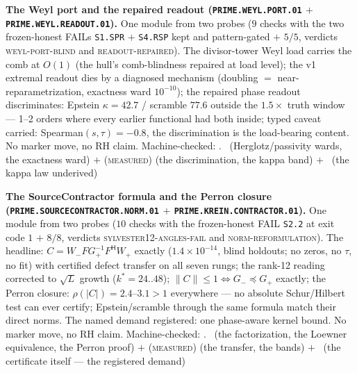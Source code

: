 \par\smallskip\noindent\textbf{The Weyl port and the repaired
readout (\texttt{PRIME.WEYL.\allowbreak PORT.01} $+$
\texttt{PRIME.WEYL.\allowbreak READOUT.01}).}
One module from two probes ($9$ checks with the two
frozen-honest FAILs \texttt{S1.SPR} $+$ \texttt{S4.RSP} kept
and pattern-gated $+$ $5/5$, verdicts \textsc{weyl-port-blind}
and \textsc{readout-repaired}).  The divisor-tower Weyl load
carries the comb at $O(1)$ (the hull's comb-blindness repaired
at load level); the v1 extremal readout dies by a diagnosed
mechanism (doubling $=$ near-reparametrization, exactness ward
$10^{-10}$); the repaired phase readout discriminates: Epstein
$\kappa = 42.7$ / scramble $77.6$ outside the $1.5\times$ truth
window --- 1--2 orders where every earlier functional had both
inside; typed caveat carried: Spearman$(s,\tau) = -0.8$, the
discrimination is the load-bearing content.  No marker move, no
RH claim.
Machine-checked: .
\mE\ (Herglotz/passivity wards, the exactness ward) $+$
(\textsc{measured}) (the discrimination, the kappa band) $+$
\mO\ (the kappa law underived)
\par\smallskip


\par\smallskip\noindent\textbf{The SourceContractor formula and
the Perron closure
(\texttt{PRIME.SOURCECONTRACTOR.\allowbreak NORM.01} $+$
\texttt{PRIME.KREIN.\allowbreak CONTRACTOR.01}).}
One module from two probes ($10$ checks with the frozen-honest
FAIL \texttt{S2.2} at exit code $1$ $+$ $8/8$, verdicts
\textsc{sylvester12-angles-fail} and
\textsc{norm-reformulation}).  The headline: $C =
W_-FG_+^{-1}F^{\mathsf H}W_+$ exactly ($1.4\times10^{-14}$,
blind holdouts; no zeros, no $\tau$, no fit) with certified
defect transfer on all seven rungs; the rank-12 reading
corrected to $\sqrt{L}$ growth ($k^* = 24..48$); $\|C\| \le 1
\Leftrightarrow G_- \preceq G_+$ exactly; the Perron closure:
$\rho(|C|) = 2.4$--$3.1 > 1$ everywhere --- no absolute
Schur/Hilbert test can ever certify; Epstein/scramble through
the same formula match their direct norms.  The named demand
registered: one phase-aware kernel bound.  No marker move, no
RH claim.
Machine-checked: .
\mE\ (the factorization, the Loewner equivalence, the Perron
proof) $+$ (\textsc{measured}) (the transfer, the bands) $+$
\mO\ (the certificate itself --- the registered demand)
\par\smallskip


